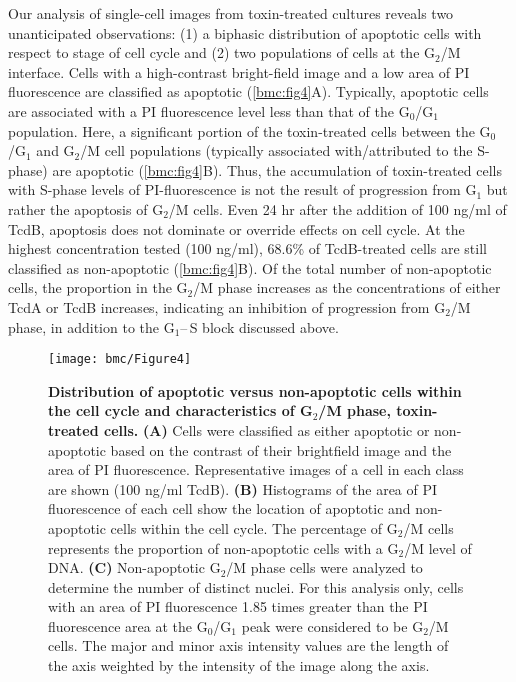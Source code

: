 Our analysis of single-cell images from toxin-treated cultures 
reveals two unanticipated observations: (1) a biphasic 
distribution of apoptotic cells with respect to stage of 
cell cycle and (2) two populations of cells at the 
G$_{\text{2}}$/M interface.  Cells with a high-contrast 
bright-field image and a low area of PI fluorescence are 
classified as apoptotic (\autoref{bmc:fig4}A). Typically, 
apoptotic cells are associated with a PI fluorescence level 
less than that of the G$_{\text{0}}$/G$_{\text{1}}$ 
population.  Here, a significant portion of the 
toxin-treated cells between the G$_{\text{0}}$/G$_{\text{1}}$ 
and G$_{\text{2}}$/M cell populations (typically 
associated with/attributed to the S-phase) are 
apoptotic (\autoref{bmc:fig4}B). Thus, the accumulation 
of toxin-treated cells with S-phase levels of 
PI-fluorescence is not the result of progression 
from G$_{\text{1}}$ but rather the apoptosis of 
G$_{\text{2}}$/M cells. Even 24 hr after the addition 
of 100 ng/ml of TcdB, apoptosis does not dominate or 
override effects on cell cycle. At the highest 
concentration tested (100 ng/ml), 68.6\% of TcdB-treated 
cells are still classified as non-apoptotic 
(\autoref{bmc:fig4}B). Of the total number of non-apoptotic 
cells, the proportion in the G$_{\text{2}}$/M phase 
increases as the concentrations of either TcdA or 
TcdB increases, indicating an inhibition of progression 
from G$_{\text{2}}$/M phase, in addition to the 
G$_{\text{1}}$--\,S block discussed above.


\begin{figure}[h!]
  \centering
  \texttt{[image: bmc/Figure4]}
  \caption[Distribution of apoptotic versus non-apoptotic 
  cells within the cell cycle and characteristics of 
  G$_{\text{2}}$/M phase, toxin-treated cells]{
  \textbf{Distribution of apoptotic versus non-apoptotic 
  cells within the cell cycle and characteristics of 
  G$_{\text{2}}$/M phase, toxin-treated cells.}
  \textbf{(A)} Cells were classified as either apoptotic 
  or non-apoptotic based on the contrast of their 
  brightfield image and the area of PI fluorescence. 
  Representative images of a cell in each class are 
  shown (100 ng/ml TcdB). 
  \textbf{(B)} Histograms of the area of PI fluorescence 
  of each cell show the location of apoptotic and non-apoptotic 
  cells within the cell cycle. The percentage of 
  G$_{\text{2}}$/M cells represents the proportion of non-apoptotic 
  cells with a G$_{\text{2}}$/M level of DNA.
  \textbf{(C)} Non-apoptotic G$_{\text{2}}$/M phase cells 
  were analyzed to determine the number of distinct nuclei. 
  For this analysis only, cells with an area of PI 
  fluorescence 1.85 times greater than the PI 
  fluorescence area at the G$_{\text{0}}$/G$_{\text{1}}$ 
  peak were considered to be G$_{\text{2}}$/M cells. 
  The major and minor axis intensity values are the 
  length of the axis weighted by the intensity of the 
  image along the axis.
}
  \label{bmc:fig4}
\end{figure}


